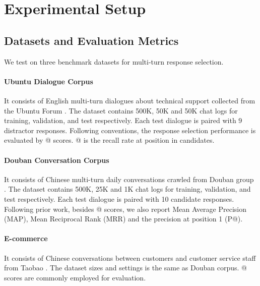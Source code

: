\documentclass[11pt,a4paper]{article}
\begin{document}
	\section{Experimental Setup}
	\subsection{Datasets and Evaluation Metrics}
	We test on three benchmark datasets for multi-turn response selection.
	\paragraph{Ubuntu Dialogue Corpus} It consists of English multi-turn dialogues about technical support collected from the Ubuntu Forum \cite{lowe2015ubuntu}. The dataset contains 500K, 50K and 50K chat logs for training, validation, and test respectively. Each test dialogue is paired with 9 distractor responses. Following conventions, the response selection performance is evaluated by @ scores. @ is the recall rate at position  in  candidates.
	
	\paragraph{Douban Conversation Corpus} It consists of Chinese multi-turn daily conversations crawled from Douban group \cite{wu2017sequential}. The dataset contains 500K, 25K and 1K chat logs for training, validation, and test respectively. Each test dialogue is paired with 10 candidate responses. Following prior work, besides @ scores, we also report Mean Average Precision (MAP), Mean Reciprocal Rank (MRR) and the precision at position 1 (P@).
	
	\paragraph{E-commerce} It consists of Chinese conversations between customers and customer service staff from Taobao \cite{zhang2018modeling}. The dataset sizes and settings is the same as Douban corpus. @ scores are commonly employed for evaluation.
\end{document}

